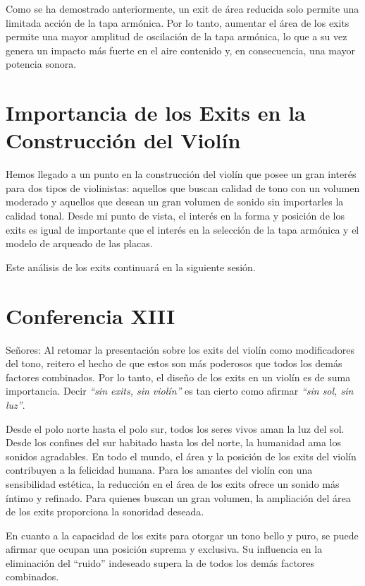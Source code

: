 \documentclass[12pt]{book}
\begin{document}
Como se ha demostrado anteriormente, un exit de área reducida solo permite una limitada acción de la tapa armónica. Por lo tanto, aumentar el área de los exits permite una mayor amplitud de oscilación de la tapa armónica, lo que a su vez genera un impacto más fuerte en el aire contenido y, en consecuencia, una mayor potencia sonora.

\section*{Importancia de los Exits en la Construcción del Violín}

Hemos llegado a un punto en la construcción del violín que posee un gran interés para dos tipos de violinistas: aquellos que buscan calidad de tono con un volumen moderado y aquellos que desean un gran volumen de sonido sin importarles la calidad tonal. Desde mi punto de vista, el interés en la forma y posición de los exits es igual de importante que el interés en la selección de la tapa armónica y el modelo de arqueado de las placas. 

Este análisis de los exits continuará en la siguiente sesión.

\section*{Conferencia XIII}

Señores: Al retomar la presentación sobre los exits del violín como modificadores del tono, reitero el hecho de que estos son más poderosos que todos los demás factores combinados. Por lo tanto, el diseño de los exits en un violín es de suma importancia. Decir \textit{“sin exits, sin violín”} es tan cierto como afirmar \textit{“sin sol, sin luz”}. 

Desde el polo norte hasta el polo sur, todos los seres vivos aman la luz del sol. Desde los confines del sur habitado hasta los del norte, la humanidad ama los sonidos agradables. En todo el mundo, el área y la posición de los exits del violín contribuyen a la felicidad humana. Para los amantes del violín con una sensibilidad estética, la reducción en el área de los exits ofrece un sonido más íntimo y refinado. Para quienes buscan un gran volumen, la ampliación del área de los exits proporciona la sonoridad deseada.

En cuanto a la capacidad de los exits para otorgar un tono bello y puro, se puede afirmar que ocupan una posición suprema y exclusiva. Su influencia en la eliminación del “ruido” indeseado supera la de todos los demás factores combinados.
\end{document}
